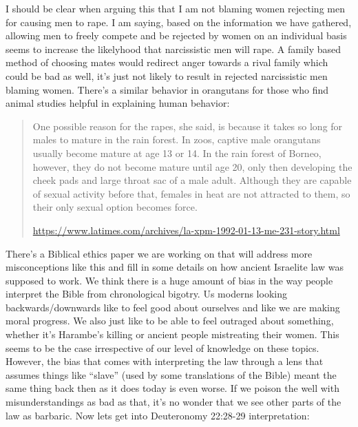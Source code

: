 \documentclass[11pt]{article}
\begin{document}
I should be clear when arguing this that I am not blaming women rejecting men for causing men to rape. I am saying, based on the information we have gathered, allowing men to freely compete and be rejected by women on an individual basis seems to increase the likelyhood that narcissistic men will rape. A family based method of choosing mates would redirect anger towards a rival family which could be bad as well, it’s just not likely to result in rejected narcissistic men blaming women. There’s a similar behavior in orangutans for those who find animal studies helpful in explaining human behavior:
\begin{quote}
One possible reason for the rapes, she said, is because it takes so long for males to mature in the rain forest. In zoos, captive male orangutans usually become mature at age 13 or 14. In the rain forest of Borneo, however, they do not become mature until age 20, only then developing the cheek pads and large throat sac of a male adult. Although they are capable of sexual activity before that, females in heat are not attracted to them, so their only sexual option becomes force.

\url{https://www.latimes.com/archives/la-xpm-1992-01-13-me-231-story.html}
\end{quote}

There’s a Biblical ethics paper we are working on that will address more misconceptions like this and fill in some details on how ancient Israelite law was supposed to work. We think there is a huge amount of bias in the way people interpret the Bible from chronological bigotry. Us moderns looking backwards/downwards like to feel good about ourselves and like we are making moral progress. We also just like to be able to feel outraged about something, whether it’s Harambe’s killing or ancient people mistreating their women. This seems to be the case irrespective of our level of knowledge on these topics. However, the bias that comes with interpreting the law through a lens that assumes things like “slave” (used by some translations of the Bible) meant the same thing back then as it does today is even worse. If we poison the well with misunderstandings as bad as that, it’s no wonder that we see other parts of the law as barbaric. Now lets get into Deuteronomy 22:28-29 interpretation:
\end{document}
